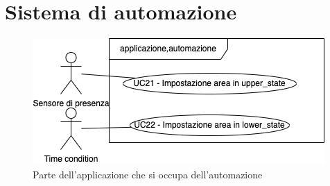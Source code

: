 \section{Sistema di automazione}

\begin{figure}[H]
    \includegraphics[width=\textwidth]{contenuti/img/casi_uso_grafici-applicazione,automazione.png}
    \caption{Parte dell'applicazione che si occupa dell'automazione}
    \label{fig:automazione}
\end{figure}
